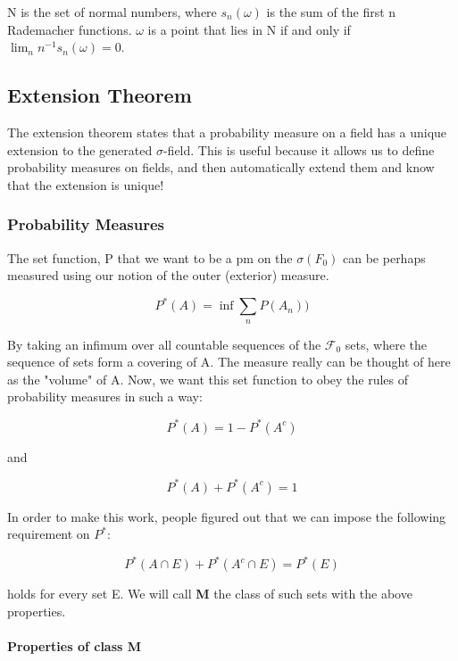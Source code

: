 \documentclass{article}
\theoremstyle{proposition}
\begin{document}
			N is the set of normal numbers, where $s_n(\omega)$ is the sum of the first n Rademacher functions. $\omega$ is a point that lies in N if and only if $\lim_n n^{-1} s_n(\omega) = 0$. 

	\subsection{Extension Theorem}
		The extension theorem states that a probability measure on a field has a unique extension to the generated $\sigma$-field. This is useful because it allows us to define probability measures on fields, and then automatically extend them and know that the extension is unique! 

		\subsubsection{Probability Measures}
			The set function, P that we want to be a pm on the $\sigma(F_0)$ can be perhaps measured using our notion of the outer (exterior) measure.

				$$P^*(A) = \inf \sum_n P(A_n))$$

			By taking an infimum over all countable sequences of the $\mathcal{F}_0$ sets, where the sequence of sets form a covering of A. The measure really can be thought of here as the "volume" of A. Now, we want this set function to obey the rules of probability measures in such a way:

				$$P^*(A) = 1 - P^*(A^c)$$

			and

				$$P^*(A) + P^*(A^c) = 1$$

			In order to make this work, people figured out that we can impose the following requirement on $P^*$:

				$$P^*(A \cap E) + P^*(A^c \cap E) = P^*(E)$$

			holds for every set E. We will call \textbf{M} the class of such sets with the above properties.

			\paragraph{Properties of class M}
\end{document}
